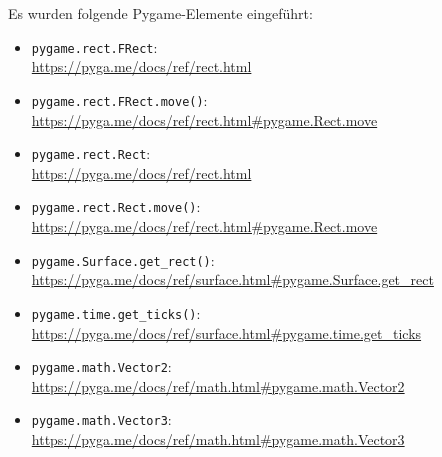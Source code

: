 Es wurden folgende Pygame-Elemente eingeführt:

\begin{itemize}

	\item \texttt{pygame.rect.FRect}:
	\\
	\url{https://pyga.me/docs/ref/rect.html}
	
	\item \texttt{pygame.rect.FRect.move()}:
    \\
    \url{https://pyga.me/docs/ref/rect.html#pygame.Rect.move}

	\item \texttt{pygame.rect.Rect}:
    \\
    \url{https://pyga.me/docs/ref/rect.html}

   \item \texttt{pygame.rect.Rect.move()}:
   \\
   \url{https://pyga.me/docs/ref/rect.html#pygame.Rect.move}

	\item \texttt{pygame.Surface.get\_rect()}:
	\\
	\url{https://pyga.me/docs/ref/surface.html#pygame.Surface.get_rect}

	\item \texttt{pygame.time.get\_ticks()}:
    \\
    \url{https://pyga.me/docs/ref/surface.html#pygame.time.get_ticks}

    \item \texttt{pygame.math.Vector2}:
    \\
    \url{https://pyga.me/docs/ref/math.html#pygame.math.Vector2}

    \item \texttt{pygame.math.Vector3}:
    \\
    \url{https://pyga.me/docs/ref/math.html#pygame.math.Vector3}
\end{itemize}

